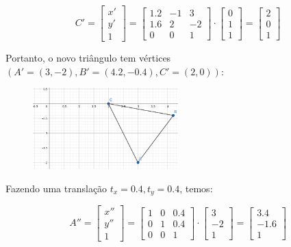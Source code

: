 \documentclass{article}
\begin{document}
$$C' = \begin{bmatrix}
	x'\\
	y'\\
	1
\end{bmatrix} = \begin{bmatrix}
	1.2 & -1 & 3\\
	1.6 & 2 & -2\\
	0 & 0 & 1
\end{bmatrix} \cdot \begin{bmatrix}
	0\\
	1\\
	1
\end{bmatrix} = \begin{bmatrix}
	2\\
	0\\
	1
\end{bmatrix}$$

Portanto, o novo triângulo tem vértices $(A'=(3, -2), B'=(4.2, -0.4), C'=(2, 0))$:

\begin{figure}[ht!]
	\centering
	\includegraphics[width=0.5\textwidth]{img/n_triangle.png}
\end{figure}

Fazendo uma translação $t_x = 0.4, t_y = 0.4$, temos:

$$A'' = \begin{bmatrix}
	x''\\
	y''\\
	1
\end{bmatrix} = \begin{bmatrix}
	1 & 0 & 0.4\\
	0 & 1 & 0.4\\
	0 & 0 & 1
\end{bmatrix} \cdot \begin{bmatrix}
	3\\
	-2\\
	1
\end{bmatrix} = \begin{bmatrix}
	3.4\\
	-1.6\\
	1
\end{bmatrix}$$
\end{document}
